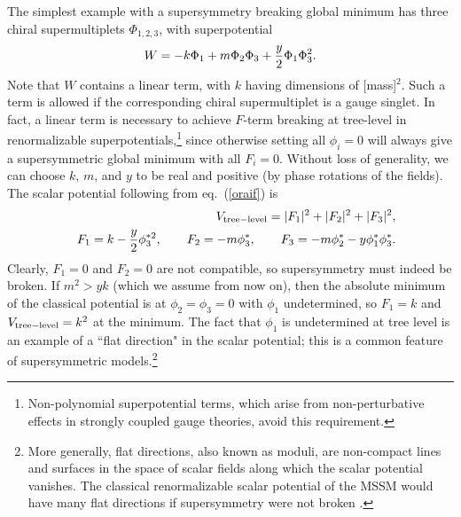 \documentclass[11pt]{article}
\def\beq{\begin{eqnarray}}
\def\eeq{\end{eqnarray}}
\begin{document}
The simplest example with a supersymmetry breaking 
global minimum has three chiral supermultiplets $\Phi_{1,2,3}$, with superpotential
\beq
W = -k \Phi_1 + m \Phi_2 \Phi_3 + {y\over 2} \Phi_1 \Phi_3^2 .
\label{oraif}
\eeq
Note that $W$ contains a linear term, with $k$ having dimensions of
[mass]$^2$.  Such a term is allowed if the corresponding chiral
supermultiplet is a gauge singlet.  In fact, a linear term is necessary to
achieve $F$-term breaking at tree-level in renormalizable
superpotentials,\footnote{Non-polynomial superpotential terms, which
arise from non-perturbative effects in strongly coupled gauge theories, 
avoid this requirement.} since
otherwise setting all $\phi_i=0$ will always give a supersymmetric global
minimum with all $F_i=0$. Without loss of generality, we can choose $k$,
$m$, and $y$ to be real and positive (by phase rotations of the fields).
The scalar potential following from eq.~(\ref{oraif}) is
\beq
&& V_{\rm tree-level} = |F_1|^2 + |F_2|^2 + |F_3|^2, \\
&& F_1 =
k - {y\over 2} \phi_3^{*2} ,\qquad
F_2 = -m \phi^*_3 ,\qquad
F_3 = -m \phi^*_2 - y \phi^*_1 \phi^*_3 .
\eeq
Clearly, $F_1=0$ and $F_2=0$ are not compatible, so supersymmetry must
indeed be broken. If $m^2 > yk$ (which we assume from now on), then the
absolute minimum of the classical potential is at $\phi_2=\phi_3=0$ with $\phi_1$
undetermined, so $F_1 = k$ and $V_{\rm tree-level}=k^2$ at the minimum. The fact that
$\phi_1$ is undetermined at tree level is an example of a ``flat direction" in the
scalar potential; this is a common feature of supersymmetric
models.\footnote{More generally, flat directions, also known as moduli, are non-compact lines
and surfaces in the space of scalar fields along which the scalar
potential vanishes. The classical renormalizable scalar potential of the MSSM would have
many flat directions if supersymmetry were not broken 
\cite{flatdirections}.}
\end{document}
